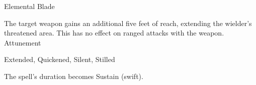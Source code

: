 \begin{spellsection}{Elemental Blade}
\begin{spellheader}
\end{spellheader}
\begin{spellcontent}
\begin{spelltargetinginfo}
\end{spelltargetinginfo}
\begin{spelleffects}
\spelleffect
The target weapon gains an additional five feet of reach, extending the wielder's threatened area.
This has no effect on ranged attacks with the weapon.
\spelldur Attunement
\end{spelleffects}
\end{spellcontent}
\begin{spellfooter}
 Extended, Quickened, Silent, Stilled
\end{spellfooter}
\begin{spellsubcontent}
\begin{spellcantrip}
The spell's duration becomes Sustain (swift).
\end{spellcantrip}
\end{spellsubcontent}
\end{spellsection}
